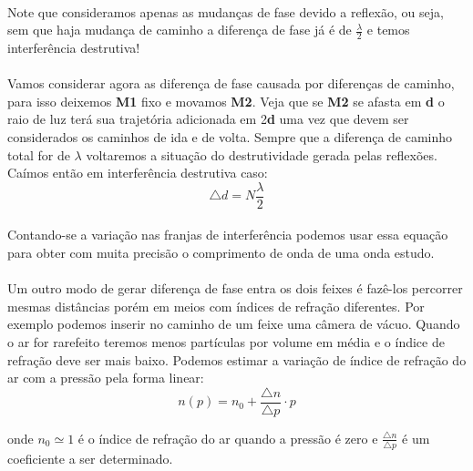 \documentclass[a4paper,11pt]{article}
\begin{document}
\paragraph{} Note que consideramos apenas as mudanças de fase devido a reflexão, ou seja, sem que haja mudança de caminho a diferença de fase já é de $\frac{\lambda}{2}$ e temos interferência destrutiva!

\paragraph{}Vamos considerar agora as diferença de fase causada por diferenças de caminho, para isso deixemos \textbf{M1} fixo e movamos \textbf{M2}. Veja que se \textbf{M2} se afasta em \textbf{d} o raio de luz terá sua trajetória adicionada em 2\textbf{d} uma vez que devem ser considerados os caminhos de ida e de volta. Sempre que a diferença de caminho total for de \textbf{$\lambda$} voltaremos a situação do destrutividade gerada pelas reflexões. Caímos então em interferência destrutiva caso:
\begin{equation}
	\triangle d = N \frac{\lambda}{2}
	\label{form-proced1}
\end{equation}


\paragraph{}Contando-se a variação nas franjas de interferência podemos usar essa equação para obter com muita precisão o comprimento de onda de uma onda estudo.

\paragraph{} Um outro modo de gerar diferença de fase entra os dois feixes é fazê-los percorrer mesmas distâncias porém em meios com índices de refração diferentes. Por exemplo podemos inserir no caminho de um feixe uma câmera de vácuo. Quando o ar for rarefeito teremos menos partículas por volume em média e o índice de refração deve ser mais baixo. Podemos estimar a variação de índice de refração do ar com a pressão pela forma linear:
\begin{equation}
	n(p) = n_{0} + \frac{\triangle n}{\triangle p}\cdot p
	\label{eq:n(p)}
\end{equation}

onde $n_0 \simeq 1$ é o índice de refração do ar quando a pressão é zero e $\frac{\triangle n}{\triangle p}$ é um coeficiente a ser determinado.
\end{document}
